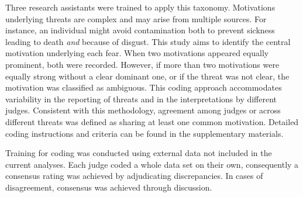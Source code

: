 \documentclass[
  man,floatsintext]{apa7}
\begin{document}
Three research assistants were trained to apply this taxonomy.
Motivations underlying threats are complex and may arise from multiple sources.
For instance, an individual might avoid contamination both to prevent sickness leading to death \emph{and} because of disgust.
This study aims to identify the central motivation underlying each fear.
When two motivations appeared equally prominent, both were recorded.
However, if more than two motivations were equally strong without a clear dominant one, or if the threat was not clear, the motivation was classified as ambiguous.
This coding approach accommodates variability in the reporting of threats and in the interpretations by different judges.
Consistent with this methodology, agreement among judges or across different threats was defined as sharing at least one common motivation.
Detailed coding instructions and criteria can be found in the supplementary materials.

Training for coding was conducted using external data not included in the current analyses.
Each judge coded a whole data set on their own, consequently a consensus rating was achieved by adjudicating discrepancies.
In cases of disagreement, consensus was achieved through discussion.
\end{document}
